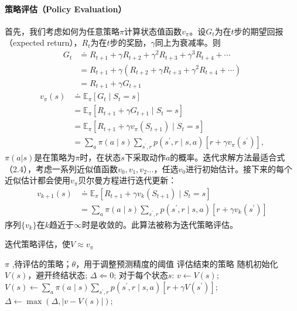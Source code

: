 \paragraph{策略评估（Policy Evaluation）}
首先，我们考虑如何为任意策略$\pi$计算状态值函数$v_{\pi}$。设$G_{t}$为在$t$步的期望回报（expected return），$R_{t}$为在$t$步的奖励，$\gamma$同上为衰减率。则
\begin{equation}
  \begin{aligned}
  G_{t} & \doteq R_{t+1}+\gamma R_{t+2}+\gamma^{2} R_{t+3}+\gamma^{3} R_{t+4}+\cdots \\
  &=R_{t+1}+\gamma\left(R_{t+2}+\gamma R_{t+3}+\gamma^{2} R_{t+4}+\cdots\right) \\
  &=R_{t+1}+\gamma G_{t+1}
  \end{aligned}
\end{equation}
\begin{equation}
  \begin{aligned}
  v_{\pi}(s) & \doteq \mathbb{E}_{\pi}\left[G_{t} \mid S_{t}=s\right] \\
  &=\mathbb{E}_{\pi}\left[R_{t+1}+\gamma G_{t+1} \mid S_{t}=s\right] \\
  &=\mathbb{E}_{\pi}\left[R_{t+1}+\gamma v_{\pi}\left(S_{t+1}\right) \mid S_{t}=s\right] \\
  &=\sum_{a} \pi(a \mid s) \sum_{s^{\prime}, r} p\left(s^{\prime}, r \mid s, a\right)\left[r+\gamma v_{\pi}\left(s^{\prime}\right)\right],
  \end{aligned}
\end{equation}
$\pi(a|s)$是在策略为$\pi$时，在状态$s$下采取动作$a$的概率。迭代求解方法最适合式（2.4），考虑一系列近似值函数$v_{0},v_{1},v_{2}\dots$，任选$v_{0}$进行初始估计。接下来的每个近似估计都会使用$v_{\pi}$贝尔曼方程\cite{dixit1990optimization}进行迭代更新：
\begin{equation}
  \begin{aligned}
  v_{k+1}(s) & \doteq \mathbb{E}_{\pi}\left[R_{t+1}+\gamma v_{k}\left(S_{t+1}\right) \mid S_{t}=s\right] \\
  &=\sum_{a} \pi(a \mid s) \sum_{s^{\prime}, r} p\left(s^{\prime}, r \mid s, a\right)\left[r+\gamma v_{k}\left(s^{\prime}\right)\right]
  \end{aligned}
\end{equation}
序列$\{v_{k}\}$在$k$趋近于$\infty$时是收敛的\cite{kamien2013dynamic}。此算法被称为迭代策略评估\cite{Sutton1998}。
\begin{algorithm}[htb]
  \caption{迭代策略评估，使$V\approx v_{\pi} $}
  \begin{algorithmic}[1]
    \Require $\pi$ ,待评估的策略；$\theta$，用于调整预测精度的阈值
    \Ensure 评估结束的策略
    \State 随机初始化$V(s)$，避开终结状态;
    \Repeat
    \State $\Delta\Leftarrow 0$;
    \Loop 对于每个状态$s$:
    \State $v \leftarrow V(s)$;
    \State $V(s) \leftarrow \sum_{a} \pi(a \mid s) \sum_{s^{\prime}, r} p\left(s^{\prime}, r \mid s, a\right)\left[r+\gamma V\left(s^{\prime}\right)\right]$;
    \State $\Delta \leftarrow \max (\Delta,|v-V(s)|)$;
    \Endloop
  \end{algorithmic}
\end{algorithm}
